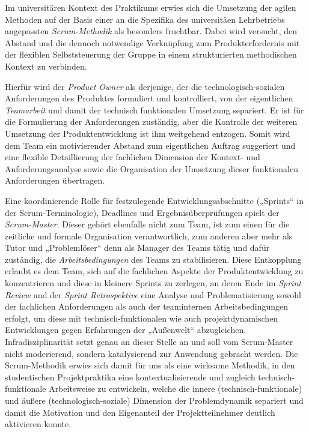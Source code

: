 \documentclass[a4paper,11pt]{article}
\begin{document}
Im universitären Kontext des Praktikums erwies sich die Umsetzung der agilen
Methoden auf der Basis einer an die Spezifika des universitäen Lehrbetriebs
angepassten \emph{Scrum-Methodik} als besonders fruchtbar. Dabei wird
versucht, den Abstand und die dennoch notwendige Verknüpfung zum
Produkterfordernis mit der flexiblen Selbststeuerung der Gruppe in einem
strukturierten methodischen Kontext zu verbinden.

Hierfür wird der \emph{Product Owner} als derjenige, der die
technologisch-sozialen Anforderungen des Produktes formuliert und
kontrolliert, von der eigentlichen \emph{Teamarbeit} und damit der technisch
funktionalen Umsetzung separiert. Er ist für die Formulierung der
Anforderungen zuständig, aber die Kontrolle der weiteren Umsetzung der
Produktentwicklung ist ihm weitgehend entzogen. Somit wird dem Team ein
motivierender Abstand zum eigentlichen Auftrag suggeriert und eine flexible
Detaillierung der fachlichen Dimension der Kontext- und Anforderungsanalyse
sowie die Organisation der Umsetzung dieser funktionalen Anforderungen
übertragen.

Eine koordinierende Rolle für festzulegende Entwicklungsabschnitte („Sprints“
in der Scrum-Terminologie), Deadlines und Ergebnisüberprüfungen spielt der
\emph{Scrum-Master}. Dieser gehört ebenfalls nicht zum Team, ist zum einen für
die zeitliche und formale Organisation verantwortlich, zum anderen aber mehr
als Tutor und „Problemlöser“ denn als Manager des Teams tätig und dafür
zuständig, die \emph{Arbeitsbedingungen} des Teams zu stabilisieren. Diese
Entkopplung erlaubt es dem Team, sich auf die fachlichen Aspekte der
Produktentwicklung zu konzentrieren und diese in kleinere Sprints zu zerlegen,
an deren Ende im \emph{Sprint Review} und der \emph{Sprint Retrospektive} eine
Analyse und Problematisierung sowohl der fachlichen Anforderungen als auch der
teaminternen Arbeitsbedingungen erfolgt, um diese mit technisch-funktionalen
wie auch projektdynamischen Entwicklungen gegen Erfahrungen der „Außenwelt“
abzugleichen. Infradisziplinarität setzt genau an dieser Stelle an und soll
vom Scrum-Master nicht moderierend, sondern katalysierend zur Anwendung
gebracht werden. Die Scrum-Methodik erwies sich damit für uns als eine
wirksame Methodik, in den studentischen Projektpraktika eine
kontextualisierende und zugleich technisch-funktionale Arbeitsweise zu
entwickeln, welche die innere (technisch-funktionale) und äußere
(technologisch-soziale) Dimension der Problemdynamik separiert und damit die
Motivation und den Eigenanteil der Projektteilnehmer deutlich aktivieren
konnte.
\end{document}
